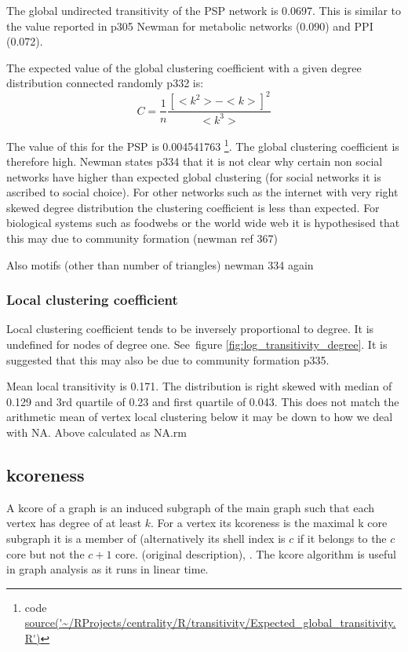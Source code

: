 The global undirected transitivity of the PSP network is 0.0697. This is similar to the value reported in p305 Newman \cite{newman2018networks} for metabolic networks (0.090) and PPI (0.072).

The expected value of the global clustering coefficient with a given degree distribution connected randomly \cite{newman2018networks} p332 is:
\begin{equation}
    C=\frac{1}{n}\frac{[<k^2> - <k>]^2}{<k^3>}
\end{equation}

The value of this for the PSP is 0.004541763 \footnote{code \url{source('~/RProjects/centrality/R/transitivity/Expected_global_transitivity.R')}}. The global clustering coefficient is therefore high. Newman states p334 \cite{newman2018networks} that it is not clear why certain non social networks have higher than expected global clustering (for social networks it is ascribed to social choice). For other networks such as the internet with very right skewed degree distribution the clustering coefficient is less than expected. For biological systems such as foodwebs or the world wide web it is hypothesised that this may due to community formation (newman ref 367)

Also motifs (other than number of triangles) newman 334 again

\subsubsection{Local clustering coefficient}
Local clustering coefficient tends to be inversely proportional to degree. It is undefined for nodes of degree one. See~figure \ref{fig:log_transitivity_degree}. It is suggested that this may also be due to community formation \cite{newman2018networks} p335.

Mean local transitivity is 0.171. The distribution is right skewed with median of 0.129 and 3rd quartile of 0.23 and first quartile of 0.043. This does not match the arithmetic mean of vertex local clustering below it may be down to how we deal with NA. Above calculated as NA.rm



\subsection{kcoreness}

A kcore of a graph is an induced subgraph of the main graph such that each vertex has degree of at least $k$. For a vertex its kcoreness is the maximal k core subgraph it is a member of (alternatively its shell index is $c$ if it belongs to the $c$ core but not the $c+1$ core. \cite{seidman1983network} (original description), \cite{alvarez2006large}. The kcore algorithm is useful in graph analysis as it runs in linear time. 

